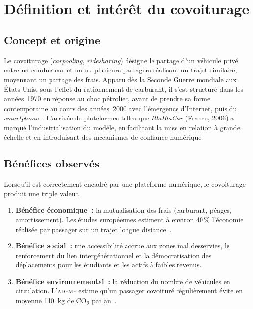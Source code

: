 \section{Définition et intérêt du covoiturage}
\label{sec:definition-covoiturage}

\subsection{Concept et origine}

Le covoiturage (\textit{carpooling}, \textit{ridesharing}) désigne le partage d'un véhicule privé entre un conducteur et un ou plusieurs passagers réalisant un trajet similaire, moyennant un partage des frais. Apparu dès la Seconde Guerre mondiale aux États-Unis, sous l'effet du rationnement de carburant, il s'est structuré dans les années~1970 en réponse au choc pétrolier, avant de prendre sa forme contemporaine au cours des années~2000 avec l'émergence d'Internet, puis du \textit{smartphone}~\cite{chan_carpooling_2012}. L'arrivée de plateformes telles que \textit{BlaBlaCar} (France, 2006) a marqué l'industrialisation du modèle, en facilitant la mise en relation à grande échelle et en introduisant des mécanismes de confiance numérique.

\subsection{Bénéfices observés}

Lorsqu'il est correctement encadré par une plateforme numérique, le covoiturage produit une triple valeur.
\begin{enumerate}
  \item \textbf{Bénéfice économique~:} la mutualisation des frais (carburant, péages, amortissement). Les études européennes estiment à environ 40\,\% l'économie réalisée par passager sur un trajet longue distance~\cite{blablacar_report_2023}.
  \item \textbf{Bénéfice social~:} une accessibilité accrue aux zones mal desservies, le renforcement du lien intergénérationnel et la démocratisation des déplacements pour les étudiants et les actifs à faibles revenus.
  \item \textbf{Bénéfice environnemental~:} la réduction du nombre de véhicules en circulation. L'\textsc{ademe} estime qu'un passager covoituré régulièrement évite en moyenne 110~kg de CO\textsubscript{2} par an~\cite{ademe_2022}.
\end{enumerate}

